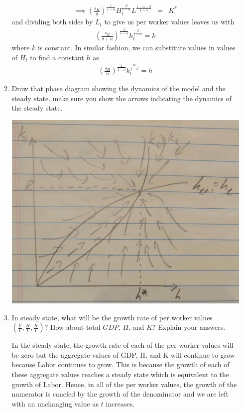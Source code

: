 \documentclass[11pt]{SelfArxOneColBMN}
\begin{document}
\begin{enumerate}
\begin{enumerate}
\begin{solution}
\begin{eqnarray*}
        \implies (\frac{s_K}{\delta})^\frac{1}{1 - \alpha}H_t^\frac{\beta}{1 - \alpha} L^\frac{1 - \alpha - \beta}{1 - \alpha} &=& K^*
      \end{eqnarray*}
      and dividing both sides by $L_t$ to give us per worker values leaves us with
      \begin{eqnarray*}
        (\frac{s_K}{\delta + n})^\frac{1}{1 - \alpha}h_t^\frac{\beta}{1 - \alpha} = k
      \end{eqnarray*}
      where $k$ is constant. In similar fashion, we can substitute values in values of $H_t$ to find a constant $h$ as
      \begin{eqnarray*}
        (\frac{s_H}{n})^\frac{1}{1 - \beta}k_t^\frac{\alpha}{1 - \beta} = h
      \end{eqnarray*}
    \end{solution}
    \item Draw that phase diagram showing the dynamics of the model and the steady state. make sure you show the arrows indicating the dynamics of the steady state.
    \begin{solution}
    \end{solution}
      \includegraphics[scale=.185]{graph1b.JPG}\\
      \centering
    \item In steady state, what will be the growth rate of per worker values $(\frac{Y}{L},\frac{H}{L},\frac{K}{L})$? How about total $GDP$, $H$, and $K$? Explain your answers.
    \begin{solution}
      In the steady state, the growth rate of each of the per worker values will be zero but the aggregate values of GDP, H, and K will continue to grow because Labor continues to grow. This is because the growth of each of these aggregate values reaches a steady state which is equivalent to the growth of Labor. Hence, in all of the per worker values, the growth of the numerator is cancled by the growth of the denominator and we are left with an unchanging value as $t$ increases.
      

\end{solution}
\end{enumerate}
\end{enumerate}
\end{document}
